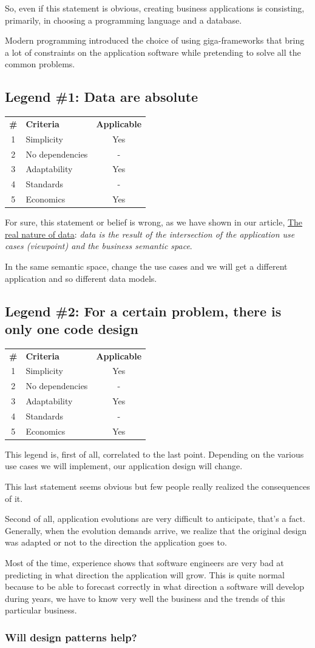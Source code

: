 \documentclass[]{article}
\newcommand{\criterias}[5]
{\begin{center}
\rowcolors{2}{gray!25}{white}
{\small\begin{tabular}{clc}
\rowcolor{gray!50}
\textbf{\#} & \textbf{Criteria} & \textbf{Applicable} \\
1 & Simplicity      & #1 \\
2 & No dependencies & #2 \\
3 & Adaptability    & #3 \\
4 & Standards       & #4 \\
5 & Economics       & #5 \\
\end{tabular}}
\end{center}}
\begin{document}
So, even if this statement is obvious, creating business applications is consisting, primarily, in choosing a programming language and a database.

Modern programming introduced the choice of using giga-frameworks that bring a lot of constraints on the application software while pretending to solve all the common problems.

\subsection{Legend \#1: Data are absolute}

\criterias{Yes}{-}{Yes}{-}{Yes}

For sure, this statement or belief is wrong, as we have shown in our article, \href{https://orey.github.io/papers/articles/data-interop/}{The real nature of data}: \emph{data is the result of the intersection of the application use cases (viewpoint) and the business semantic space}.

In the same semantic space, change the use cases and we will get a different application and so different data models.

\subsection{Legend \#2: For a certain problem, there is only one code design}

\criterias{Yes}{-}{Yes}{-}{Yes}

This legend is, first of all, correlated to the last point. Depending on the various use cases we will implement, our application design will change.

This last statement seems obvious but few people really realized the consequences of it.

Second of all, application evolutions are very difficult to anticipate, that's a fact. Generally, when the evolution demands arrive, we realize that the original design was adapted or not to the direction the application goes to.

Most of the time, experience shows that software engineers are very bad at predicting in what direction the application will grow. This is quite normal because to be able to forecast correctly in what direction a software will develop during years, we have to know very well the business and the trends of this particular business.

\subsubsection{Will design patterns help?}
\end{document}
